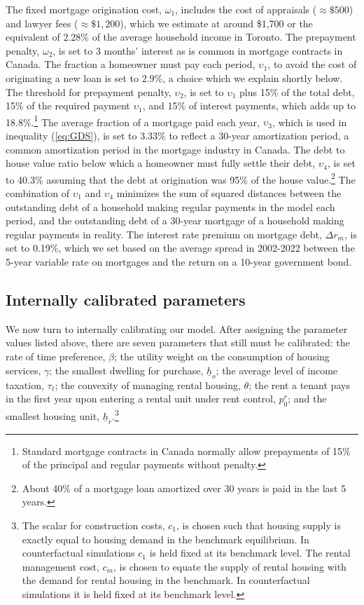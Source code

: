 \documentclass[parskip=full]{article}
\begin{document}
The fixed mortgage origination cost, $\omega_{1}$, includes the cost of appraisals ($\approx \$500$) and lawyer fees ($\approx \$1,200$), which we estimate at around \$1,700 or the equivalent of 2.28\% of the average household income in Toronto. The prepayment penalty, $\omega_{2}$, is set to 3 months' interest as is common in mortgage contracts in Canada. The fraction a homeowner must pay each period, $\upsilon_{1}$, to avoid the cost of originating a new loan is set to 2.9\%, a choice which we explain shortly below. The threshold for prepayment penalty, $\upsilon_{2}$, is set to $\upsilon_{1}$ plus 15\% of the total debt, 15\% of the required payment $\upsilon_{1}$, and 15\% of interest payments, which adds up to 18.8\%.\footnote{Standard mortgage contracts in Canada normally allow prepayments of 15\% of the principal and regular payments without penalty.} The average fraction of a mortgage paid each year, $\upsilon_{3}$, which is used in inequality (\ref{eq:GDS}), is set to 3.33\% to reflect a 30-year amortization period, a common amortization period in the mortgage industry in Canada. The debt to house value ratio below which a homeowner must fully settle their debt, $\upsilon_{4}$, is set to 40.3\% assuming that the debt at origination was 95\% of the house value.\footnote{About 40\% of a mortgage loan amortized over 30 years is paid in the last 5 years.} The combination of $\upsilon_{1}$ and $\upsilon_{4}$ minimizes the sum of squared distances between the outstanding debt of a household making regular payments in the model each period, and the outstanding debt of a 30-year mortgage of a household making regular payments in reality. The interest rate premium on mortgage debt, $\Delta r_{m}$, is set to 0.19\%, which we set based on the average spread in 2002-2022 between the 5-year variable rate on mortgages and the return on a 10-year government bond.

\subsection{Internally calibrated parameters}

We now turn to internally calibrating our model. After assigning the parameter values listed above, there are seven parameters that still must be calibrated: the rate of time preference, $\beta$; the utility weight on the consumption of housing services, $\gamma$; the smallest dwelling for purchase, $\underline{h}_{o}$; the average level of income taxation, $\tau_{\ell}$; the convexity of managing rental housing, $\theta$; the rent a tenant pays in the first year upon entering a rental unit under rent control, $p^{r}_{0}$; and the smallest housing unit, $\underline{h}_{r}$.\footnote{The scalar for construction costs, $c_{1}$, is chosen such that housing supply is exactly equal to housing demand in the benchmark equilibrium. In counterfactual simulations $c_{1}$ is held fixed at its benchmark level. The rental management cost, $c_{m}$, is chosen to equate the supply of rental housing with the demand for rental housing in the benchmark. In counterfactual simulations it is held fixed at its benchmark level.}
\end{document}

